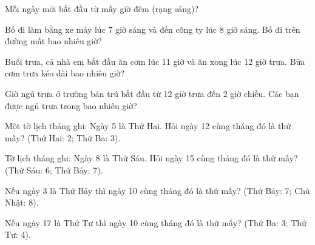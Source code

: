 \begin{ex}
Mỗi ngày mới bắt đầu từ mấy giờ đêm (rạng sáng)?
\end{ex}

\begin{ex}
Bố đi làm bằng xe máy lúc 7 giờ sáng và đến công ty lúc 8 giờ sáng. Bố đi trên đường mất bao nhiêu giờ?
\end{ex}

\begin{ex}
Buổi trưa, cả nhà em bắt đầu ăn cơm lúc 11 giờ và ăn xong lúc 12 giờ trưa. Bữa cơm trưa kéo dài bao nhiêu giờ?
\end{ex}

\begin{ex}
Giờ ngủ trưa ở trường bán trú bắt đầu từ 12 giờ trưa đến 2 giờ chiều. Các bạn được ngủ trưa trong bao nhiêu giờ?
\end{ex}

\begin{ex}
Một tờ lịch tháng ghi: Ngày 5 là Thứ Hai. Hỏi ngày 12 cùng tháng đó là thứ mấy? (Thứ Hai: 2; Thứ Ba: 3).
\end{ex}

\begin{ex}
Tờ lịch tháng ghi: Ngày 8 là Thứ Sáu. Hỏi ngày 15 cùng tháng đó là thứ mấy? (Thứ Sáu: 6; Thứ Bảy: 7).
\end{ex}

\begin{ex}
Nếu ngày 3 là Thứ Bảy thì ngày 10 cùng tháng đó là thứ mấy? (Thứ Bảy: 7; Chủ Nhật: 8).
\end{ex}

\begin{ex}
Nếu ngày 17 là Thứ Tư thì ngày 10 cùng tháng đó là thứ mấy? (Thứ Ba: 3; Thứ Tư: 4).
\end{ex}

